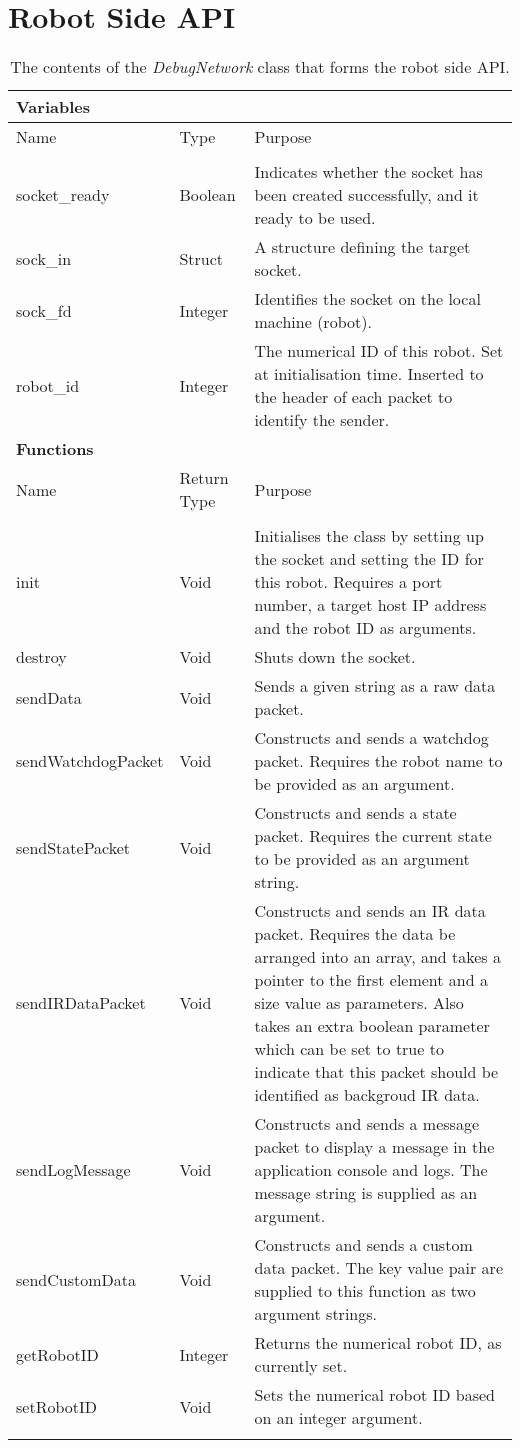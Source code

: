\chapter{Robot Side API}

\label{AppendixRobotAPI}

\begin{longtable}{ l l p{8cm} }
\caption[Robot API]{The contents of the \textit{DebugNetwork} class that forms the robot side API.}\\
 \hline
 \multicolumn{3}{l}{\textbf{Variables}} \\
 \hline
 Name & Type & Purpose\\
 \hline\\
 socket\_ready & Boolean & Indicates whether the socket has been created successfully, and it ready to be used.\\
 sock\_in & Struct & A structure defining the target socket.\\
 sock\_fd & Integer & Identifies the socket on the local machine (robot).\\
 robot\_id & Integer & The numerical ID of this robot. Set at initialisation time. Inserted to the header of each packet to identify the sender.\\
 \hline
 \multicolumn{3}{l}{\textbf{Functions}} \\
 \hline
 Name & Return Type & Purpose\\
 \hline\\
 init & Void & Initialises the class by setting up the socket and setting the ID for this robot. Requires a port number, a target host IP address and the robot ID as arguments. \\
 destroy & Void & Shuts down the socket. \\
 sendData & Void & Sends a given string as a raw data packet. \\
 sendWatchdogPacket & Void & Constructs and sends a watchdog packet. Requires the robot name to be provided as an argument. \\
 sendStatePacket & Void & Constructs and sends a state packet. Requires the current state to be provided as an argument string. \\
 sendIRDataPacket & Void & Constructs and sends an IR data packet. Requires the data be arranged into an array, and takes a pointer to the first element and a size value as parameters. Also takes an extra boolean parameter which can be set to true to indicate that this packet should be identified as backgroud IR data.\\
 sendLogMessage & Void & Constructs and sends a message packet to display a message in the application console and logs. The message string is supplied as an argument.\\
 sendCustomData & Void & Constructs and sends a custom data packet. The key value pair are supplied to this function as two argument strings.\\
 getRobotID & Integer & Returns the numerical robot ID, as currently set. \\
 setRobotID & Void & Sets the numerical robot ID based on an integer argument. \\
 
 \label{tab:RobotAPI}
\end{longtable}